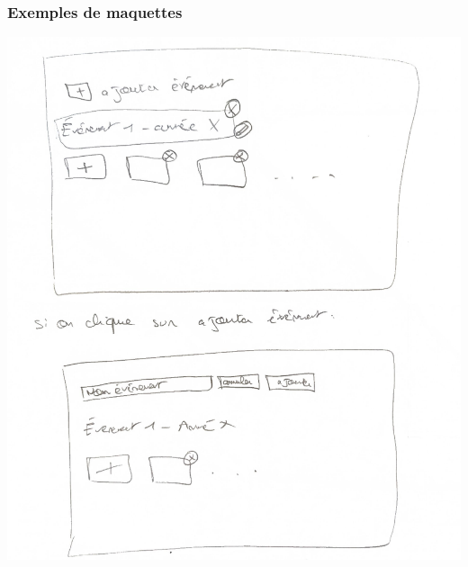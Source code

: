 \documentclass[pdf]{beamer}
\begin{document}
\begin{frame}
    \frametitle{Exemples de maquettes}

    \begin{minipage}{0.48\textwidth}
        \centering
        \includegraphics[width=\linewidth]{../0-report/assets/pictures/maquette.png}
    \end{minipage}
    \hfill
    \begin{minipage}{0.48\textwidth}
        \centering

\end{minipage}
\end{frame}
\end{document}
